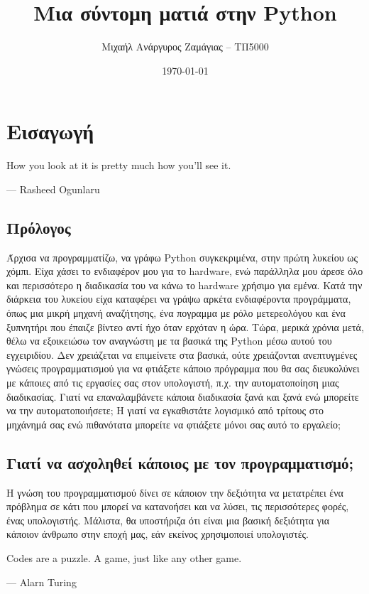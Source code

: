 \documentclass[14pt]{extreport}
\title{Μια σύντομη ματιά στην Python}
\author{Μιχαήλ Ανάργυρος Ζαμάγιας -- ΤΠ5000}
\date{\today}
\begin{document}
\maketitle

\tableofcontents
\newpage

\chapter{Εισαγωγή}

\epigraph{How you look at it is pretty much how you'll see it.}{--- Rasheed Ogunlaru}

\newpage

\section{Πρόλογος}

Άρχισα να προγραμματίζω, να γράφω Python συγκεκριμένα, στην πρώτη λυκείου ως χόμπι. Είχα χάσει το ενδιαφέρον μου για το hardware, ενώ παράλληλα μου άρεσε όλο και περισσότερο η διαδικασία του να κάνω το hardware χρήσιμο για εμένα. Κατά την διάρκεια του λυκείου είχα καταφέρει να γράψω αρκέτα ενδιαφέροντα προγράμματα, όπως μια μικρή μηχανή αναζήτησης, ένα πογραμμα με ρόλο μετερεολόγου και ένα ξυπνητήρι που έπαιζε βίντεο αντί ήχο όταν ερχόταν η ώρα. Τώρα, μερικά χρόνια μετά, θέλω να εξοικειώσω τον αναγνώστη με τα βασικά της Python μέσω αυτού του εγχειριδίου. Δεν χρειάζεται να επιμείνετε στα βασικά, ούτε χρειάζονται ανεπτυγμένες γνώσεις προγραμματισμού για να φτιάξετε κάποιο πρόγραμμα που θα σας διευκολύνει με κάποιες από τις εργασίες σας στον υπολογιστή, π.χ. την αυτοματοποίηση μιας διαδικασίας. Γιατί να επαναλαμβάνετε κάποια διαδικασία ξανά και ξανά ενώ μπορείτε να την αυτοματοποιήσετε; Η γιατί να εγκαθιστάτε λογισμικό από τρίτους στο μηχάνημά σας ενώ πιθανότατα μπορείτε να φτιάξετε μόνοι σας αυτό το εργαλείο;

\section{Γιατί να ασχοληθεί κάποιος με τον προγραμματισμό;}

Η γνώση του προγραμματισμού δίνει σε κάποιον την δεξιότητα να μετατρέπει ένα πρόβλημα σε κάτι που μπορεί να κατανοήσει και να λύσει, τις περισσότερες φορές, ένας υπολογιστής. Μάλιστα, θα υποστήριζα ότι είναι μια βασική δεξιότητα για κάποιον άνθρωπο στην εποχή μας, εάν εκείνος χρησιμοποιεί υπολογιστές.

\epigraph{Codes are a puzzle. A game, just like any other game.}{--- Alarn Turing}
\end{document}
